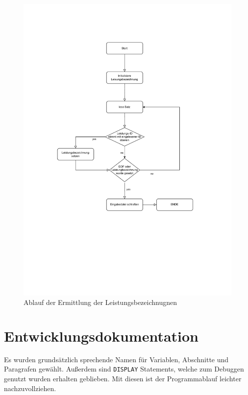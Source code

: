 \begin{figure}[!h]
    \centering
    \includegraphics[width=\textwidth,height=\textheight,keepaspectratio]{images/Erhalte_Leistungsbezeichnung-PAP.pdf}
    \caption{
        Ablauf der Ermittlung der Leistungsbezeichnugnen
    }
    \label{fig:diagramm3}
\end{figure}



\section{Entwicklungsdokumentation}\label{sec:entwicklerdokumentation}
Es wurden grundsätzlich sprechende Namen für Variablen, Abschnitte und Paragrafen gewählt. Außerdem sind \texttt{DISPLAY} Statements, welche zum Debuggen genutzt wurden erhalten geblieben. Mit diesen ist der Programmablauf leichter nachzuvollziehen.

